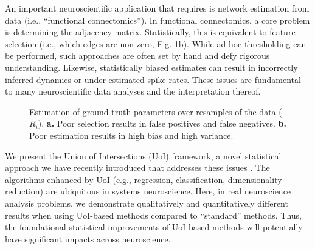 \documentclass[letterpaper, 10 pt, conference]{ieeeconf}  %
\begin{document}
An important neuroscientific application that requires is network estimation from data (i.e., ``functional connectomics''). In functional connectomics, a core problem is determining the adjacency matrix. Statistically, this is equivalent to feature selection (i.e., which edges are non-zero, Fig.  \ref{fig:intro}b). While ad-hoc thresholding can be performed, such approaches are often set by hand and defy rigorous understanding. Likewise, statistically biased estimates can result in incorrectly inferred dynamics or under-estimated spike rates. These issues are fundamental to many neuroscientific data analyses and the interpretation thereof.

\begin{figure}[b]
    \vspace{-15pt}
    \centering
    \vspace{-20pt}
    \caption{Estimation of ground truth parameters over resamples of the data ($R_i$). \textbf{a.} Poor selection results in false positives and false negatives. \textbf{b.} Poor estimation results in high bias and high variance.}
    \label{fig:intro}
\end{figure}

We present the Union of Intersections (UoI) framework, a novel statistical approach we have recently introduced that addresses these issues \cite{uoi}. The algorithms enhanced by UoI (e.g., regression, classification, dimensionality reduction) are ubiquitous in systems neuroscience. Here, in real neuroscience analysis problems, we demonstrate qualitatively and quantitatively different results when using UoI-based methods compared to ``standard'' methods.  Thus, the foundational statistical improvements of UoI-based methods will potentially have significant impacts across neuroscience.
\end{document}
